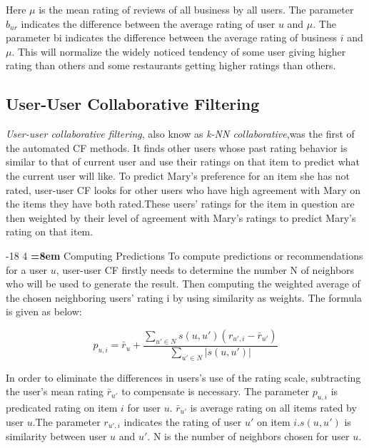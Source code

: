 \documentclass{llncs}
\makeatletter
\renewcommand\subsubsection{\@startsection{subsubsection}{3}{\z@}%
	{-18\p@ \@plus -4\p@ \@minus -4\p@}%
	{4\p@ \@plus 2\p@ \@minus 2\p@}%
	{\normalfont\normalsize\bfseries\boldmath
		\rightskip=\z@ \@plus 8em\pretolerance=10000 }}
\makeatother
\begin{document}
Here $\mu$ is the mean rating of reviews of all business by all users. The parameter $b_{ur}$ indicates the difference between the average rating of user $u$ and $\mu$. The parameter bi indicates the difference between the average rating of business $i$ and $\mu$. This will normalize the widely noticed tendency of some user giving higher rating than others and some restaurants getting higher ratings than others.


\subsection{User-User Collaborative Filtering}
\textit{User-user collaborative filtering}, also know as \textit{k-NN collaborative},was the first of the automated CF methods. It finds other users whose past rating behavior is similar to that of current user and
use their ratings on that item to predict what the current user will like. To predict Mary's preference for an item she has not rated, user-user CF looks for other users who have high agreement with Mary on the items they have both rated.These users’ ratings for the item in question are then weighted by their level of agreement with Mary's ratings to predict Mary's rating on that item. 

\subsubsection{Computing Predictions}
To compute predictions or recommendations for a user $u$, user-user CF firstly needs to determine the number N of neighbors who will be used to generate the result. Then computing the weighted average of the chosen neighboring users' rating i by using similarity as weights. The formula is given as below:

\begin{equation}
p_{u,i} ={\bar r_{u}}  + \frac
{\sum\nolimits_{u' \in N} s(u,u')(r_{u',i} - {\bar r_{u'}})} 
{\sum\nolimits_{u' \in N} |s(u,u')|}
\end{equation}

In order to eliminate the differences in users's use of the rating scale, subtracting the user's mean rating ${\bar r_{u'}}$ to compensate is necessary.   The parameter $p_{u,i}$ is predicated rating on item $i$ for user $u$.  ${\bar r_{u'}}$ is average rating on all items rated by user $u$.The parameter $r_{u',i}$ indicates the rating of user $u'$ on item $i$.$s(u,u')$ is similarity between user $u$ and $u'$. N is the number of neighbors chosen for user $u$.  
\end{document}
